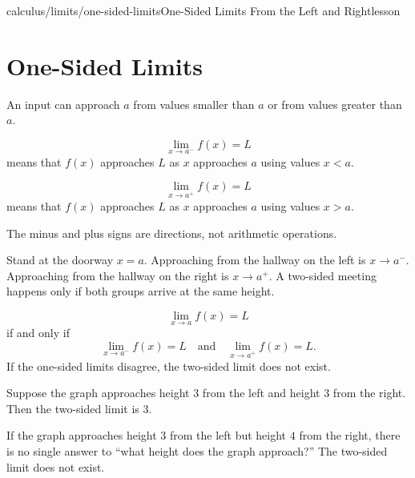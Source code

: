 \begin{webpage}{calculus/limits/one-sided-limits}{One-Sided Limits From the Left and Right}{lesson}
\section{One-Sided Limits}


An input can approach \(a\) from values smaller than \(a\) or from values greater than \(a\).

\begin{bgdefinition}[title={One-Sided Limit Notation}]
\[
  \lim_{x\to a^-}f(x)=L
\]
means that \(f(x)\) approaches \(L\) as \(x\) approaches \(a\) using values \(x<a\).

\[
  \lim_{x\to a^+}f(x)=L
\]
means that \(f(x)\) approaches \(L\) as \(x\) approaches \(a\) using values \(x>a\).
\end{bgdefinition}

The minus and plus signs are directions, not arithmetic operations.

\begin{bgconcept}
Stand at the doorway \(x=a\). Approaching from the hallway on the left is \(x\to a^-\). Approaching from the hallway on the right is \(x\to a^+\). A two-sided meeting happens only if both groups arrive at the same height.
\end{bgconcept}

\begin{bgtheorem}[title={One-Sided Test for a Two-Sided Limit}]
\[
  \boxed{\lim_{x\to a}f(x)=L}
\]
if and only if
\[
  \boxed{\lim_{x\to a^-}f(x)=L
  \quad\text{and}\quad
  \lim_{x\to a^+}f(x)=L.}
\]
If the one-sided limits disagree, the two-sided limit does not exist.
\end{bgtheorem}

\begin{bgguided}[title={Two staircases}]
Suppose the graph approaches height \(3\) from the left and height \(3\) from the right. Then the two-sided limit is \(3\).

If the graph approaches height \(3\) from the left but height \(4\) from the right, there is no single answer to ``what height does the graph approach?'' The two-sided limit does not exist.
\end{bgguided}




\end{webpage}
